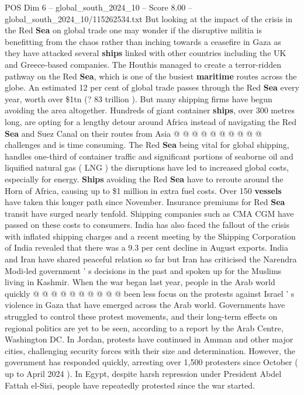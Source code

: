 \begin{textsample}{POS Dim 6 – global\_south\_2024\_10 – Score 8.00 – global\_south\_2024\_10/115262534.txt}
But looking at the impact of the crisis in the Red \textbf{Sea} on global trade one may wonder if the disruptive militia is benefitting from the chaos rather than inching towards a ceasefire in Gaza as they have attacked several \textbf{ships} linked with other countries including the UK and Greece-based companies.
The Houthis managed to create a terror-ridden pathway on the Red \textbf{Sea}, which is one of the busiest \textbf{maritime} routes across the globe.
An estimated 12 per cent of global trade passes through the Red \textbf{Sea} every year, worth over \$1tn (? 83 trillion ).
But many shipping firms have begun avoiding the area altogether.
Hundreds of giant container \textbf{ships}, over 300 metres long, are opting for a lengthy detour around Africa instead of navigating the Red \textbf{Sea} and Suez Canal on their routes from Asia @ @ @ @ @ @ @ @ @ @ challenges and is time consuming.
The Red \textbf{Sea} being vital for global shipping, handles one-third of container traffic and significant portions of seaborne oil and liquified natural gas ( LNG ) the disruptions have led to increased global costs, especially for energy. \textbf{Ships} avoiding the Red \textbf{Sea} have to reroute around the Horn of Africa, causing up to \$1 million in extra fuel costs.
Over 150 \textbf{vessels} have taken this longer path since November.
Insurance premiums for Red \textbf{Sea} transit have surged nearly tenfold.
Shipping companies such as CMA CGM have passed on these costs to consumers.
India has also faced the fallout of the crisis with inflated shipping charges and a recent meeting by the Shipping Corporation of India revealed that there was a 9.3 per cent decline in August exports.
India and Iran have shared peaceful relation so far but Iran has criticised the Narendra Modi-led government ' s decisions in the past and spoken up for the Muslims living in Kashmir.
When the war began last year, people in the Arab world quickly @ @ @ @ @ @ @ @ @ @ been less focus on the protests against Israel ' s violence in Gaza that have emerged across the Arab world.
Governments have struggled to control these protest movements, and their long-term effects on regional politics are yet to be seen, according to a report by the Arab Centre, Washington DC.
In Jordan, protests have continued in Amman and other major cities, challenging security forces with their size and determination.
However, the government has responded quickly, arresting over 1,500 protesters since October ( up to April 2024 ).
In Egypt, despite harsh repression under President Abdel Fattah el-Sisi, people have repeatedly protested since the war started.

\end{textsample}
